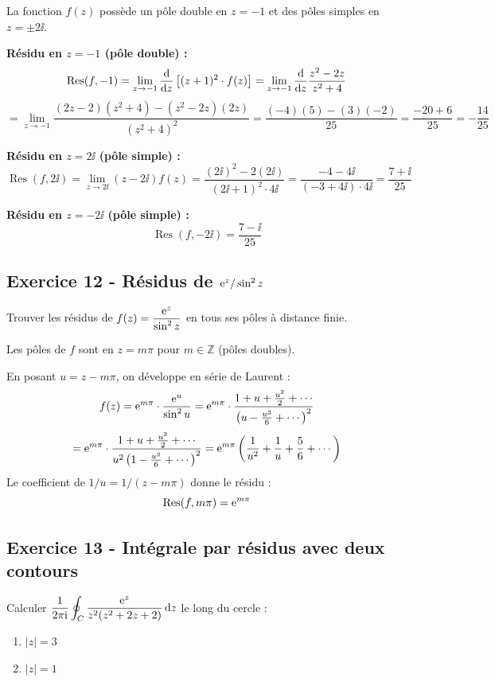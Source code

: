 \documentclass[12pt,a4paper]{article}
\begin{document}
\begin{boitecorrige}
La fonction $f(z)$ possède un pôle double en $z=-1$ et des pôles simples en $z=\pm 2\ii$.

\textbf{Résidu en $z=-1$ (pôle double) :}
\[
\operatorname{Res}(f,-1) = \lim_{z\to -1}\frac{\mathrm{d}}{\mathrm{d} z}\left[(z+1)^2\cdot f(z)\right] = \lim_{z\to -1}\frac{\mathrm{d}}{\mathrm{d} z}\frac{z^2-2z}{z^2+4}
\]
\[
= \lim_{z\to -1}\frac{(2z-2)(z^2+4) - (z^2-2z)(2z)}{(z^2+4)^2} = \frac{(-4)(5) - (3)(-2)}{25} = \frac{-20+6}{25} = -\frac{14}{25}
\]

\textbf{Résidu en $z=2\ii$ (pôle simple) :}
\[
\operatorname{Res}(f,2\ii) = \lim_{z\to 2\ii}(z-2\ii)f(z) = \frac{(2\ii)^2 - 2(2\ii)}{(2\ii+1)^2\cdot 4\ii} = \frac{-4-4\ii}{(-3+4\ii)\cdot 4\ii} = \frac{7+\ii}{25}
\]

\textbf{Résidu en $z=-2\ii$ (pôle simple) :}
\[
\operatorname{Res}(f,-2\ii) = \frac{7-\ii}{25}
\]
\end{boitecorrige}

\subsection*{Exercice 12 - Résidus de $\mathrm{e}^z/\sin^2 z$ \niveau{\difficile}}

\begin{boiteexercice}
Trouver les résidus de $f(z) = \dfrac{\mathrm{e}^z}{\sin^2 z}$ en tous ses pôles à distance finie.
\end{boiteexercice}

\begin{boitecorrige}
Les pôles de $f$ sont en $z = m\pi$ pour $m\in\mathbb{Z}$ (pôles doubles).

En posant $u = z - m\pi$, on développe en série de Laurent :
\[
f(z) = \mathrm{e}^{m\pi}\cdot\frac{\mathrm{e}^u}{\sin^2 u} = \mathrm{e}^{m\pi}\cdot\frac{1+u+\frac{u^2}{2}+\cdots}{\left(u - \frac{u^3}{6}+\cdots\right)^2}
\]
\[
= \mathrm{e}^{m\pi}\cdot\frac{1+u+\frac{u^2}{2}+\cdots}{u^2\left(1-\frac{u^2}{6}+\cdots\right)^2}
= \mathrm{e}^{m\pi}\left(\frac{1}{u^2} + \frac{1}{u} + \frac{5}{6} + \cdots\right)
\]
Le coefficient de $1/u = 1/(z-m\pi)$ donne le résidu :
\[
\operatorname{Res}(f, m\pi) = \mathrm{e}^{m\pi}
\]
\end{boitecorrige}

\subsection*{Exercice 13 - Intégrale par résidus avec deux contours \niveau{\difficile}}

\begin{boiteexercice}
Calculer $\dfrac{1}{2\pi\mathrm{i}}\displaystyle\oint_C\frac{\mathrm{e}^z}{z^2(z^2+2z+2)}\,\mathrm{d} z$ le long du cercle :
\begin{enumerate}[label=(\alph*)]
  \item $|z| = 3$
  \item $|z| = 1$
\end{enumerate}
\end{boiteexercice}
\end{document}
